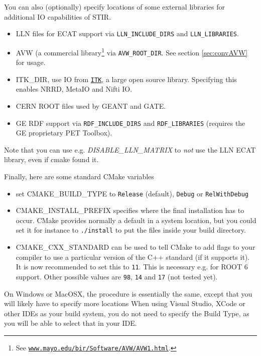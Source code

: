 \documentclass{article}
\def\url#1#2{\mbox{\href{#1}{\tt #2}}}
\begin{document}
You can also (optionally) specify locations of some external libraries for additional IO
capabilities of STIR. 
\begin{itemize}
\item LLN files for ECAT support via \texttt{LLN\_INCLUDE\_DIRS} and \texttt{LLN\_LIBRARIES}.
\item AVW\texttrademark{} (a commercial library\footnote{See \url{http://www.mayo.edu/bir/Software/AVW/AVW1.html}
{www.mayo.edu/bir/Software/AVW/AVW1.html}.}
via \texttt{AVW\_ROOT\_DIR}. See section \ref{sec:convAVW} for usage.
\item ITK\_DIR, use IO from \url{http://www.itk.org}{ITK}, a large open source library. Specifying this
 enables NRRD, MetaIO and Nifti IO.
\item CERN ROOT files used by GEANT and GATE.
\item GE RDF\texttrademark{} support via \texttt{RDF\_INCLUDE\_DIRS} and \texttt{RDF\_LIBRARIES} (requires the GE proprietary PET Toolbox).
\end{itemize}

Note that you can use e.g. \textit{DISABLE\_LLN\_MATRIX} to \textit{not}
use the LLN ECAT library, even if cmake found it.

Finally, here are some standard CMake variables
\begin{itemize}
\item set CMAKE\_BUILD\_TYPE to \texttt{Release} (default), \texttt{Debug} or \texttt{RelWithDebug}
\item CMAKE\_INSTALL\_PREFIX specifies where the final installation has to occur. CMake
provides normally a default in a system location, but you could set it for instance to
\texttt{./install} to put the files inside your build directory.
\item CMAKE\_CXX\_STANDARD can be used to tell CMake to add flags to your compiler to use
a particular version of the C++ standard (if it supports it). It is now recommended to set 
this to \texttt{11}. This is necessary e.g. for ROOT 6 support. Other possible values are
\texttt{98}, \texttt{14} and \texttt{17} (not tested yet).
\end{itemize}

On Windows or MacOSX, the procedure is essentially the same, except that you will likely have 
to specify more locations When using Visual Studio, XCode or other IDEs as  your build system,
you do not need to specify the Build Type, as you will be able to select that in 
your IDE.
\end{document}
